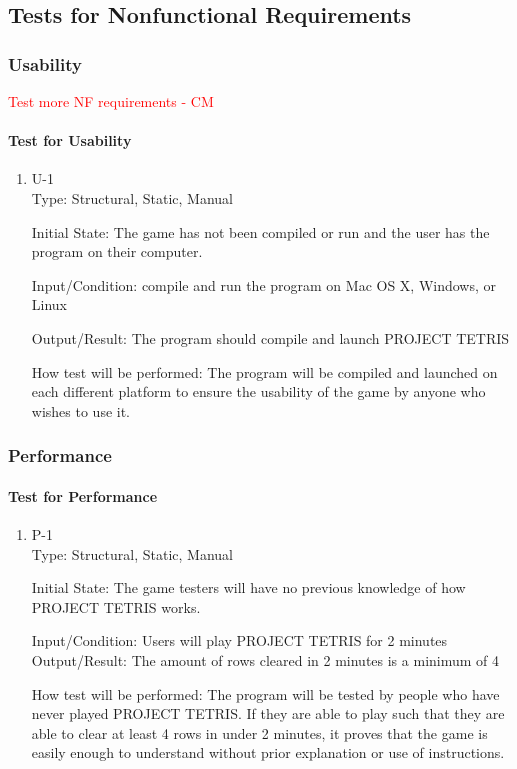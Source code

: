 \documentclass[12pt, titlepage]{article}
\begin{document}
\subsection{Tests for Nonfunctional Requirements}
\subsubsection{Usability}
\textcolor{red}{ Test more NF requirements - CM} \\
\paragraph{Test for Usability}
\begin{enumerate}
\item{U-1\\}
Type: Structural, Static, Manual
					
Initial State: The game has not been compiled or run and the user has the program on their computer.
					
Input/Condition: compile and run the program on Mac OS X, Windows, or Linux
					
Output/Result: The program should compile and launch PROJECT TETRIS
					
How test will be performed: The program will be compiled and launched on each different platform to ensure the usability of the game by anyone who wishes to use it.
					
\end{enumerate}

\subsubsection{Performance}
		
\paragraph{Test for Performance}
\begin{enumerate}
\item{P-1\\}
Type: Structural, Static, Manual
					
Initial State: The game testers will have no previous knowledge of how PROJECT TETRIS works.
					
Input/Condition: Users will play PROJECT TETRIS for 2 minutes					
Output/Result: The amount of rows cleared in 2 minutes is a minimum of 4
					
How test will be performed: The program will be tested by people who have never played PROJECT TETRIS. If they are able to play such that they are able to clear at least 4 rows in under 2 minutes, it proves that the game is easily enough to understand without prior explanation or use of instructions.
					
\end{enumerate}
\end{document}
